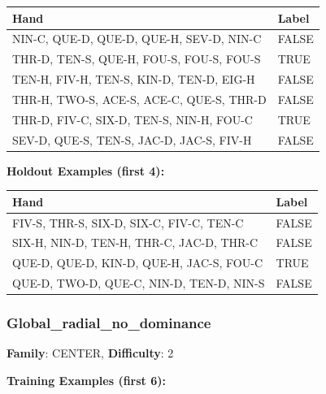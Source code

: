 \documentclass[10pt,a4paper]{article}
\begin{document}
\begin{small}
\begin{tabular}{p{8cm}l}
\toprule
Hand & Label \\
\midrule
NIN-C, QUE-D, QUE-D, QUE-H, SEV-D, NIN-C & \textcolor{negative}{FALSE} \\
THR-D, TEN-S, QUE-H, FOU-S, FOU-S, FOU-S & \textcolor{positive}{TRUE} \\
TEN-H, FIV-H, TEN-S, KIN-D, TEN-D, EIG-H & \textcolor{negative}{FALSE} \\
THR-H, TWO-S, ACE-S, ACE-C, QUE-S, THR-D & \textcolor{negative}{FALSE} \\
THR-D, FIV-C, SIX-D, TEN-S, NIN-H, FOU-C & \textcolor{positive}{TRUE} \\
SEV-D, QUE-S, TEN-S, JAC-D, JAC-S, FIV-H & \textcolor{negative}{FALSE} \\
\bottomrule
\end{tabular}
\end{small}

\textbf{Holdout Examples (first 4):}

\begin{small}
\begin{tabular}{p{8cm}l}
\toprule
Hand & Label \\
\midrule
FIV-S, THR-S, SIX-D, SIX-C, FIV-C, TEN-C & \textcolor{negative}{FALSE} \\
SIX-H, NIN-D, TEN-H, THR-C, JAC-D, THR-C & \textcolor{negative}{FALSE} \\
QUE-D, QUE-D, KIN-D, QUE-H, JAC-S, FOU-C & \textcolor{positive}{TRUE} \\
QUE-D, TWO-D, QUE-C, NIN-D, TEN-D, NIN-S & \textcolor{negative}{FALSE} \\
\bottomrule
\end{tabular}
\end{small}

\vspace{0.5cm}

\subsubsection{Global\_radial\_no\_dominance}

\textbf{Family}: CENTER, \textbf{Difficulty}: 2

\textbf{Training Examples (first 6):}
\end{document}
